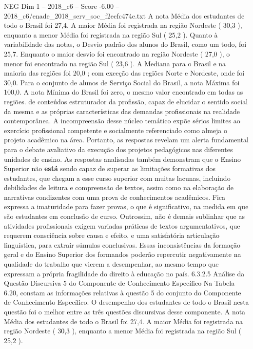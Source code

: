 \begin{textsample}{NEG Dim 1 – 2018\_c6 – Score -6.00 – 2018\_c6/enade\_2018\_serv\_soc\_f2ecfc474e.txt}
A nota Média dos estudantes de todo o Brasil foi 27,4.
A maior Média foi registrada na região Nordeste ( 30,3 ), enquanto a menor Média foi registrada na região Sul ( 25,2 ).
Quanto à variabilidade das notas, o Desvio padrão dos alunos do Brasil, como um todo, foi 25,7.
Enquanto o maior desvio foi encontrado na região Nordeste ( 27,0 ), o menor foi encontrado na região Sul ( 23,6 ).
A Mediana para o Brasil e na maioria das regiões foi 20,0 ; com exceção das regiões Norte e Nordeste, onde foi 30,0.
Para o conjunto de alunos de Serviço Social do Brasil, a nota Máxima foi 100,0.
A nota Mínima do Brasil foi zero, o mesmo valor encontrado em todas as regiões. de conteúdos estruturador da profissão, capaz de elucidar o sentido social da mesma e as próprias características das demandas profissionais na realidade contemporânea.
A incompreensão desse núcleo temático expõe sérios limites ao exercício profissional competente e socialmente referenciado como almeja o projeto acadêmico na área.
Portanto, as respostas revelam um alerta fundamental para o debate avaliativo da execução dos projetos pedagógicos nas diferentes unidades de ensino.
As respostas analisadas também demonstram que o Ensino Superior não \textbf{está} sendo capaz de superar as limitações formativas dos estudantes, que chegam a esse curso superior com muitas lacunas, incluindo debilidades de leitura e compreensão de textos, assim como na elaboração de narrativas condizentes com uma prova de conhecimentos acadêmicos.
Fica expressa a imaturidade para fazer provas, o que é significativo, na medida em que são estudantes em conclusão de curso.
Outrossim, não é demais sublinhar que as atividades profissionais exigem variadas práticas de textos argumentativos, que requerem consciência sobre causa e efeito, e uma satisfatória articulação linguística, para extrair súmulas conclusivas.
Essas inconsistências da formação geral e do Ensino Superior dos formandos poderão repercutir negativamente na qualidade do trabalho que vierem a desempenhar, ao mesmo tempo que expressam a própria fragilidade do direito à educação no país. 6.3.2.5 Análise da Questão Discursiva 5 do Componente de Conhecimento Específico Na Tabela 6.20, constam as informações relativas à questão 5 do conjunto do Componente de Conhecimento Específico.
O desempenho dos estudantes de todo o Brasil nesta questão foi o melhor entre as três questões discursivas desse componente.
A nota Média dos estudantes de todo o Brasil foi 27,4.
A maior Média foi registrada na região Nordeste ( 30,3 ), enquanto a menor Média foi registrada na região Sul ( 25,2 ).

\end{textsample}
